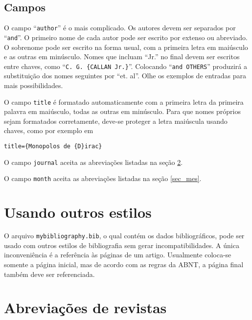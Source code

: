 \documentclass[a4paper,12pt]{article}
\newcommand{\ca}{\c{c}\~ao}
\newcommand{\co}{\c{c}\~oes}
\begin{document}
\subsection{Campos}


O campo ``\verb+author+'' \'e
o mais complicado. Os autores devem ser separados por
``\verb+and+''. O primeiro nome de cada autor pode ser escrito por extenso
ou abreviado. O sobrenome pode ser escrito na forma usual, com
a primeira letra em mai\'usculo e as outras em min\'usculo.
Nomes que incluam ``Jr.'' no final devem ser escritos entre chaves, como
``\verb+C. G. {CALLAN Jr.}+''. 
Colocando ``\verb+and OTHERS+'' produzir\'a
a substitui{\ca} dos nomes seguintes por ``et. al''.
Olhe os exemplos de entradas para mais possibilidades.

O campo \verb+title+ \'e formatado automaticamente com a primeira 
letra da primeira palavra em mai\'usculo, todas as outras em min\'usculo. 
Para que nomes pr\'oprios sejam formatados
corretamente, deve-se proteger a letra mai\'uscula usando
chaves, como por exemplo em
\begin{center}
\verb+title={Monopolos de {D}irac}+
\end{center}

O campo \verb+journal+ aceita as abrevia{\co} listadas na
se{\ca} \ref{revistas}.

O campo \verb+month+ aceita as abrevia{\co} listadas na
se{\ca} \ref{sec_mes}.




\section{Usando outros estilos}


O arquivo \verb+mybibliography.bib+, o qual cont\'em os dados 
bibliogr\'aficos, pode ser usado com outros estilos de bibliografia
sem gerar incompatibilidades. A \'unica inconveni\^encia \'e a
refer\^encia \`as p\'aginas de um artigo. Usualmente coloca-se somente
a p\'agina inicial, mas de acordo com as regras da ABNT, a p\'agina
final tamb\'em deve ser referenciada.



\section{Abrevia{\co} de revistas}
\label{revistas}
\end{document}
